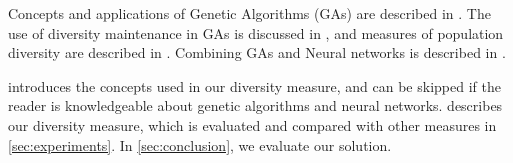 Concepts and applications of Genetic Algorithms (GAs) are described in \cite{Cobb93geneticalgorithms,DeJong:1975:ABC:907087,Luke2013Metaheuristics,Syswerda:1989:UCG:645512.657265,ursem2002diversity,fogarty,Whitley:1989:GAS:93126.93169,1250187}.
The use of diversity maintenance in GAs is discussed in \cite{diaz2007empirical,Zitzler00comparisonof,Darwen00doesextra,1266373}, and measures of population diversity are described in \cite{Nguyen:2006:ASPGP,simpson1949measurement}.
Combining GAs and Neural networks is described in \cite{masterThesisGANN}.

 introduces the concepts used in our diversity measure, and can be skipped if the reader is knowledgeable about genetic algorithms and neural networks.  describes our diversity measure, which is evaluated and compared with other measures in \cref{sec:experiments}. In \cref{sec:conclusion}, we evaluate our solution.
